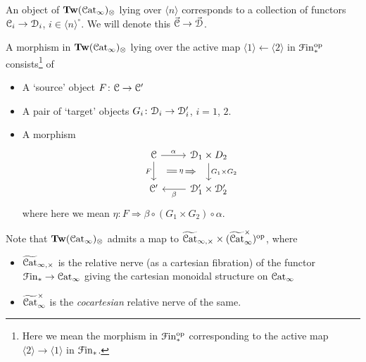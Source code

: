 \documentclass[main.tex]{subfiles}
\begin{document}
\begin{example}
  An object of $\mathbf{Tw}(\mathcal{C}\mathrm{at}_{\infty})_{\otimes}$ lying over $\langle n \rangle$ corresponds to a collection of functors $\mathcal{C}_{i} \to \mathcal{D}_{i}$, $i \in \langle n \rangle^{\circ}$. We will denote this $\vec{\mathcal{C}} \to \vec{\mathcal{D}}$.

  A morphism in $\mathbf{Tw}(\mathcal{C}\mathrm{at}_{\infty})_{\otimes}$ lying over the active map $\langle 1 \rangle \leftarrow \langle 2 \rangle$ in $\mathcal{F}\mathrm{in}_{*}^{\mathrm{op}}$ consists\footnote{Here we mean the morphism in $\mathcal{F}\mathrm{in}_{*}^{\mathrm{op}}$ corresponding to the active map $\langle 2 \rangle \to \langle 1 \rangle$ in $\mathcal{F}\mathrm{in}_{*}$.} of
  \begin{itemize}
    \item A `source' object $F\colon \mathcal{C} \to \mathcal{C}'$

    \item A pair of `target' objects $G_{i}\colon \mathcal{D}_{i} \to \mathcal{D}'_{i}$, $i = 1$, $2$.

    \item A morphism
      \begin{equation*}
        \begin{tikzcd}
          \category{C}
          \arrow[r, "\alpha"]
          \arrow[d, ""{name=L, right}, "F"{left}]
          & \category{D}_{1} \times D_{2}
          \arrow[d, ""{name=R, left}, "G_{1} \times G_{2}"{right}]
          \\
          \category{C}'
          & \category{D}'_{1} \times \category{D}'_{2}
          \arrow[l, "\beta"]
          \arrow[Rightarrow, from=L, to=R, shorten=2ex, "\eta"{description}]
        \end{tikzcd}
      \end{equation*}
      where here we mean $\eta\colon F \Rightarrow \beta \circ (G_{1} \times G_{2}) \circ \alpha$.
  \end{itemize}
\end{example}

Note that $\mathbf{Tw}(\mathcal{C}\mathrm{at}_{\infty})_{\otimes}$ admits a map to $\widetilde{\mathcal{C}\mathrm{at}}_{\infty,\times} \times (\widetilde{\mathcal{C}\mathrm{at}}_{\infty}^{\times})^{\mathrm{op}}$, where
\begin{itemize}
  \item $\widetilde{\mathcal{C}\mathrm{at}}_{\infty,\times}$ is the relative nerve (as a cartesian fibration) of the functor $\mathcal{F}\mathrm{in}_{*} \to \mathcal{C}\mathrm{at}_{\infty}$ giving the cartesian monoidal structure on $\mathcal{C}\mathrm{at}_{\infty}$

  \item $\widetilde{\mathcal{C}\mathrm{at}}_{\infty}^{\times}$ is the \emph{cocartesian} relative nerve of the same.
\end{itemize}
\end{document}
